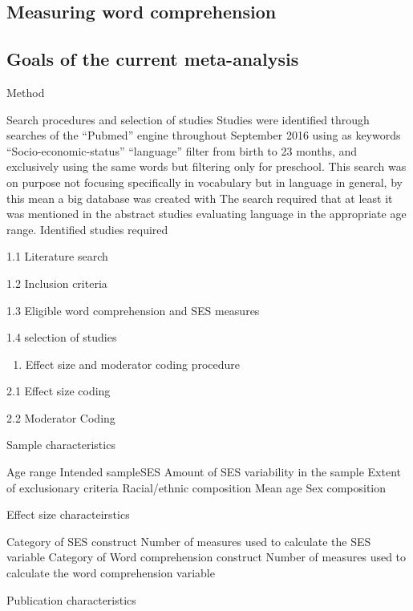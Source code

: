 \documentclass[english,man]{apa6}
\providecommand{\tightlist}{%
  \setlength{\itemsep}{0pt}\setlength{\parskip}{0pt}}
\theoremstyle{definition}
\theoremstyle{definition}
\theoremstyle{definition}
\theoremstyle{remark}
\begin{document}
\subsection{Measuring word
comprehension}\label{measuring-word-comprehension}

\subsection{Goals of the current
meta-analysis}\label{goals-of-the-current-meta-analysis}

Method

Search procedures and selection of studies Studies were identified
through searches of the \enquote{Pubmed} engine throughout September
2016 using as keywords \enquote{Socio-economic-status}
\enquote{language} filter from birth to 23 months, and exclusively using
the same words but filtering only for preschool. This search was on
purpose not focusing specifically in vocabulary but in language in
general, by this mean a big database was created with The search
required that at least it was mentioned in the abstract studies
evaluating language in the appropriate age range. Identified studies
required

1.1 Literature search

1.2 Inclusion criteria

1.3 Eligible word comprehension and SES measures

1.4 selection of studies

\begin{enumerate}
\def\labelenumi{\arabic{enumi}.}
\setcounter{enumi}{1}
\tightlist
\item
  Effect size and moderator coding procedure
\end{enumerate}

2.1 Effect size coding

2.2 Moderator Coding

Sample characteristics

Age range Intended sampleSES Amount of SES variability in the sample
Extent of exclusionary criteria Racial/ethnic composition Mean age Sex
composition

Effect size characteirstics

Category of SES construct Number of measures used to calculate the SES
variable Category of Word comprehension construct Number of measures
used to calculate the word comprehension variable

Publication characteristics
\end{document}
